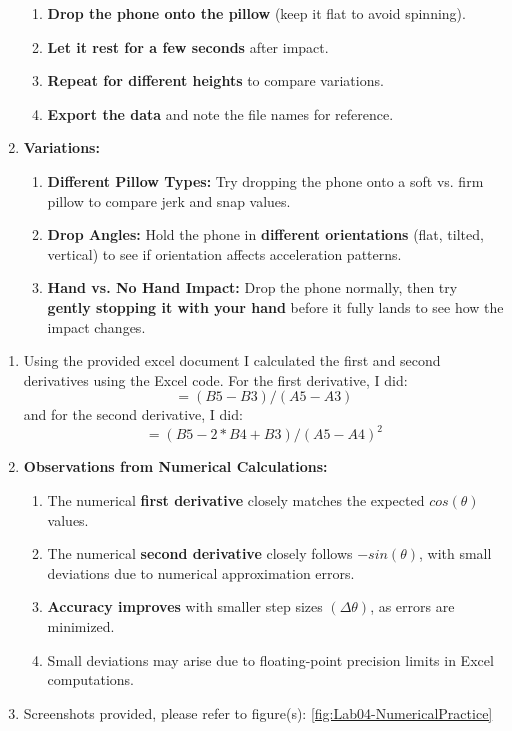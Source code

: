 \documentclass[idxtotoc,hyperref,openany]{labbook} %
\begin{document}
\begin{enumerate}
\begin{enumerate}[$\bullet$]
        \item \textbf{Drop the phone onto the pillow} (keep it flat to avoid spinning).
        \item \textbf{Let it rest for a few seconds} after impact.
        \item \textbf{Repeat for different heights} to compare variations.
        \item \textbf{Export the data} and note the file names for reference.
    \end{enumerate}
    \item \textbf{Variations:}
    \begin{enumerate}[$\bullet$]
        \item \textbf{Different Pillow Types:} Try dropping the phone onto a soft vs. firm pillow to compare jerk and snap values.
        \item \textbf{Drop Angles:} Hold the phone in \textbf{different orientations} (flat, tilted, vertical) to see if orientation affects acceleration patterns.
        \item \textbf{Hand vs. No Hand Impact:} Drop the phone normally, then try \textbf{gently stopping it with your hand} before it fully lands to see how the impact changes.
    \end{enumerate}
\end{enumerate}


\begin{enumerate}
    \item Using the provided excel document I calculated the first and second derivatives using the Excel code. For the first derivative, I did: 
    \[=(B5 - B3) / (A5 - A3)
    \]
    and for the second derivative, I did: 
    \[=(B5 - 2*B4 + B3) / (A5 - A4)^2
    \]
    \item \textbf{Observations from Numerical Calculations:}
    \begin{enumerate}[$\bullet$]
        \item The numerical \textbf{first derivative} closely matches the expected $cos(\theta)$ values.
        \item The numerical \textbf{second derivative} closely follows $-sin(\theta)$, with small deviations due to numerical approximation errors.
        \item \textbf{Accuracy improves} with smaller step sizes $(\Delta\theta)$, as errors are minimized.
        \item Small deviations may arise due to floating-point precision limits in Excel computations.
    \end{enumerate}
    \item Screenshots provided, please refer to figure(s): \ref{fig:Lab04-NumericalPractice}
\end{enumerate}
\end{document}
